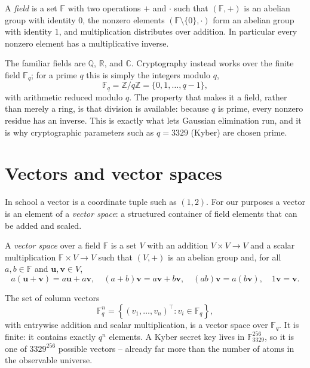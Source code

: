 \begin{definition}[Field]
A \emph{field} is a set $\mathbb{F}$ with two operations $+$ and $\cdot$ such that $(\mathbb{F},+)$ is an abelian group with identity $0$, the nonzero elements $(\mathbb{F}\setminus\{0\},\cdot)$ form an abelian group with identity $1$, and multiplication distributes over addition. In particular every nonzero element has a multiplicative inverse.
\end{definition}

The familiar fields are $\mathbb{Q}$, $\mathbb{R}$, and $\mathbb{C}$. Cryptography instead works over the finite field $\mathbb{F}_q$; for a prime $q$ this is simply the integers modulo $q$,
\[
\mathbb{F}_q = \mathbb{Z}/q\mathbb{Z} = \{0,1,\dots,q-1\},
\]
with arithmetic reduced modulo $q$. The property that makes it a field, rather than merely a ring, is that division is available: because $q$ is prime, every nonzero residue has an inverse. This is exactly what lets Gaussian elimination run, and it is why cryptographic parameters such as $q=3329$ (Kyber) are chosen prime.

\section{Vectors and vector spaces}
In school a vector is a coordinate tuple such as $(1,2)$. For our purposes a vector is an element of a \emph{vector space}: a structured container of field elements that can be added and scaled.

\begin{definition}
A \emph{vector space} over a field $\mathbb{F}$ is a set $V$ with an addition $V\times V\to V$ and a scalar multiplication $\mathbb{F}\times V\to V$ such that $(V,+)$ is an abelian group and, for all $a,b\in\mathbb{F}$ and $\mathbf{u},\mathbf{v}\in V$,
\[
a(\mathbf{u}+\mathbf{v}) = a\mathbf{u}+a\mathbf{v},\quad
(a+b)\mathbf{v} = a\mathbf{v}+b\mathbf{v},\quad
(ab)\mathbf{v} = a(b\mathbf{v}),\quad
1\mathbf{v} = \mathbf{v}.
\]
\end{definition}

\begin{example}
The set of column vectors
\[
\mathbb{F}_q^n = \left\{ (v_1,\dots,v_n)^\top : v_i \in \mathbb{F}_q \right\},
\]
with entrywise addition and scalar multiplication, is a vector space over $\mathbb{F}_q$. It is finite: it contains exactly $q^n$ elements. A Kyber secret key lives in $\mathbb{F}_{3329}^{256}$, so it is one of $3329^{256}$ possible vectors -- already far more than the number of atoms in the observable universe.
\end{example}

